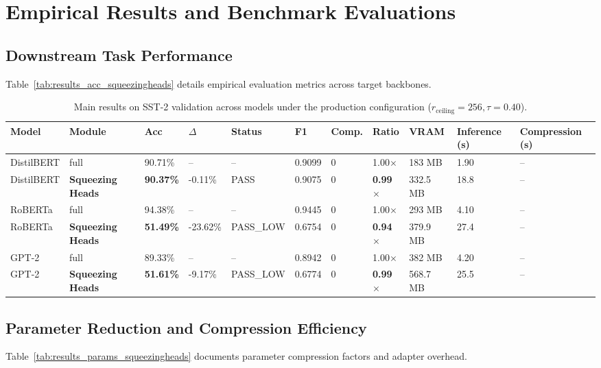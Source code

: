 \section{Empirical Results and Benchmark Evaluations}

\subsection{Downstream Task Performance}
Table~\ref{tab:results_acc_squeezingheads} details empirical evaluation metrics across target backbones.

\begin{table}[t]
\centering
\small
\begin{tabular}{lllllllllll}
\toprule
\textbf{Model} & \textbf{Module} & \textbf{Acc} & \textbf{$\Delta$} & \textbf{Status} & \textbf{F1} & \textbf{Comp.} & \textbf{Ratio} & \textbf{VRAM} & \textbf{Inference (s)} & \textbf{Compression (s)} \\
\midrule
DistilBERT & full & 90.71\% & -- & -- & 0.9099 & 0 & 1.00$\times$ & 183 MB & 1.90 & -- \\
DistilBERT & \textbf{Squeezing Heads} & \textbf{90.37\%} & -0.11\% & PASS & 0.9075 & 0 & \textbf{0.99$\times$} & 332.5 MB & 18.8 & -- \\
RoBERTa & full & 94.38\% & -- & -- & 0.9445 & 0 & 1.00$\times$ & 293 MB & 4.10 & -- \\
RoBERTa & \textbf{Squeezing Heads} & \textbf{51.49\%} & -23.62\% & PASS_LOW & 0.6754 & 0 & \textbf{0.94$\times$} & 379.9 MB & 27.4 & -- \\
GPT-2 & full & 89.33\% & -- & -- & 0.8942 & 0 & 1.00$\times$ & 382 MB & 4.20 & -- \\
GPT-2 & \textbf{Squeezing Heads} & \textbf{51.61\%} & -9.17\% & PASS_LOW & 0.6774 & 0 & \textbf{0.99$\times$} & 568.7 MB & 25.5 & -- \\
\bottomrule
\end{tabular}
\caption{Main results on SST-2 validation across models under the production configuration ($r_{\mathrm{ceiling}}=256, \tau=0.40$).}
\label{tab:main_sst2}
\end{table}

\subsection{Parameter Reduction and Compression Efficiency}
Table~\ref{tab:results_params_squeezingheads} documents parameter compression factors and adapter overhead.

